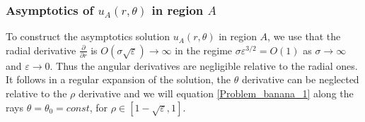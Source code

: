 \documentclass[12pt]{article}
\newcommand{\p}{\partial}
\newcommand{\eps}{\varepsilon}
\begin{document}
\subsubsection*{Asymptotics of $u_A(r,\theta)$ in region $A$}\label{s:uA}
To construct the asymptotics solution $u_A(r,\theta)$ in region $A$, we use that the radial derivative $\frac{\p}{\p r}$ is $O(\sigma\sqrt{\eps})\to\infty$ in the regime $\sigma\eps^{3/2}=O(1)$ as $\sigma\to\infty$ and $\eps\to0$. Thus the angular derivatives are negligible relative to the radial ones.  It follows in a regular expansion of the solution, the $\theta$ derivative can be neglected relative to the $\rho$ derivative and we will equation \ref{Problem_banana_1} along the rays $\theta=\theta_0=const$, for $\rho\in[1-\sqrt{\eps},1]$.
\end{document}

